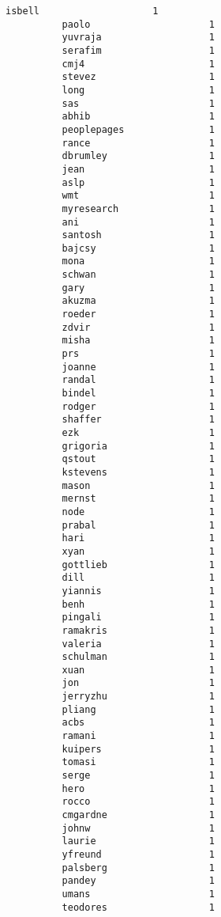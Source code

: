\documentclass[11pt]{article}
\begin{document}
\begin{Verbatim}[commandchars=\\\{\}]
          isbell                    1
          paolo                     1
          yuvraja                   1
          serafim                   1
          cmj4                      1
          stevez                    1
          long                      1
          sas                       1
          abhib                     1
          peoplepages               1
          rance                     1
          dbrumley                  1
          jean                      1
          aslp                      1
          wmt                       1
          myresearch                1
          ani                       1
          santosh                   1
          bajcsy                    1
          mona                      1
          schwan                    1
          gary                      1
          akuzma                    1
          roeder                    1
          zdvir                     1
          misha                     1
          prs                       1
          joanne                    1
          randal                    1
          bindel                    1
          rodger                    1
          shaffer                   1
          ezk                       1
          grigoria                  1
          qstout                    1
          kstevens                  1
          mason                     1
          mernst                    1
          node                      1
          prabal                    1
          hari                      1
          xyan                      1
          gottlieb                  1
          dill                      1
          yiannis                   1
          benh                      1
          pingali                   1
          ramakris                  1
          valeria                   1
          schulman                  1
          xuan                      1
          jon                       1
          jerryzhu                  1
          pliang                    1
          acbs                      1
          ramani                    1
          kuipers                   1
          tomasi                    1
          serge                     1
          hero                      1
          rocco                     1
          cmgardne                  1
          johnw                     1
          laurie                    1
          yfreund                   1
          palsberg                  1
          pandey                    1
          umans                     1
          teodores                  1

\end{Verbatim}
\end{document}
